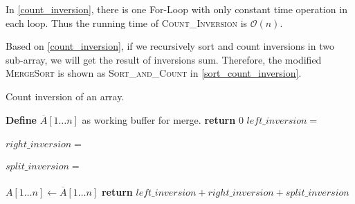 \begin{homeworkProblem}[Inversions]
\begin{algorithm}[H]
\end{algorithm}


In \cref{count_inversion}, there is one For-Loop with only constant time operation
in each loop. Thus the running time of \textsc{Count\_Inversion} is $\mathcal{O}(n)$.

Based on \cref{count_inversion}, if we recursively sort and count inversions in two
sub-array, we will get the result of inversions sum. Therefore, the modified
\textsc{MergeSort} is shown as \textsc{Sort\_and\_Count} in \cref{sort_count_inversion}.

\begin{algorithm}[H]
    \caption{Count inversion of an array.} \label{sort_count_inversion}
    \begin{algorithmic}[1]
            \State \textbf{Define} $\overline{A}[1 \ldots n]$ as working buffer for merge.
             
                \State \textbf{return} 0
            \Else {}
                \State $left\_inversion=$
                    \\\\
                \State $right\_inversion=$
                    \\\\
                \State $split\_inversion=$\Call{Count\_Inversions}{$\overline{A}[1 \ldots n]$, $A[1 \ldots \lfloor n/2 \rfloor$, $A[\lfloor n/2 \rfloor + 1 \ldots n]$}
                    \\\\
                \State $A[1 \ldots n] \leftarrow \overline{A}[1 \ldots n]$
            \EndIf
        \State \textbf{return } $left\_inversion + right\_inversion + split\_inversion$
        \EndProcedure
    \end{algorithmic}
\end{algorithm}



\end{homeworkProblem}
